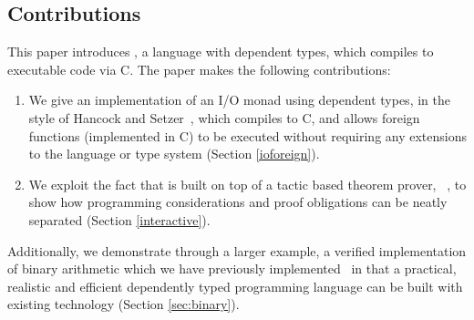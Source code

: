 \subsection{Contributions}

This paper introduces \Idris{}, a language with dependent types, which
compiles to executable code via C. The paper makes the following
contributions:

\begin{enumerate}
\item We give an implementation of an I/O monad using dependent types,
  in the style of Hancock and Setzer~\cite{hancock-interactive}, which
  compiles to C, and allows foreign functions (implemented in C) to be
  executed without requiring any extensions to the language or type
  system (Section \ref{ioforeign}).
\item We exploit the fact that \Idris{} is built on top of a tactic
  based theorem prover, \Ivor{}~\cite{ivor}, to show how programming
  considerations and proof obligations can be neatly separated
  (Section \ref{interactive}).
\end{enumerate}

Additionally, we demonstrate through a larger example, a verified
implementation of binary arithmetic which we have previously
implemented~\cite{tfp-ccc} in \Ivor{} that a practical, realistic and
efficient dependently typed programming language can be built with
existing technology (Section \ref{sec:binary}).

